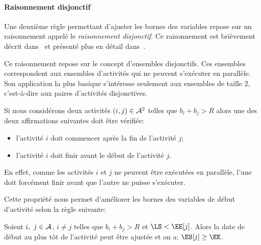 \paragraph{Raisonnement disjonctif}
Une deuxième règle permettant d'ajuster les bornes des variables
repose sur un raisonnement appelé le {\it raisonnement disjonctif}. Ce
raisonnement est brièvement décrit dans~\cite{BLPN} et présenté plus
en détail dans~\cite{Gay2015}. 

Ce raisonnement repose sur le concept d'ensembles disjonctifs. Ces
ensembles correspondent aux ensembles d'activités qui ne peuvent
s'exécuter en parallèle. Son application la plus basique s'intéresse
seulement aux ensembles de taille $2$, c'est-à-dire aux paires
d'activités disjonctives. 

Si nous considérons deux activités $(i,j) \in {\cal A}^2$ telles que
$b_i+b_j > R$ alors une des deux affirmations suivantes doit être
vérifiée:
\begin{itemize}
\item l'activité $i$ doit commencer après la fin de l'activité $j$;
\item l'activité $i$ doit finir avant le début de l'activité $j$.
\end{itemize}
En effet, comme les activités $i$ et $j$ ne peuvent être exécutées en
parallèle, l'une doit forcément finir avant que l'autre ne puisse
s'exécuter.

Cette propriété nous permet d'améliorer les bornes des variables de
début d'activité selon la règle suivante:
\begin{reg}
  Soient $i,\ j \in {\cal A}$, $i\neq j$ telles que $b_i+b_j > R$ et $\LS
  <\EE[j]$. Alors la date de début au plus tôt de l'activité peut
  être ajustée et on a: $ \ES[j] \ge \EE$. 
\end{reg}

